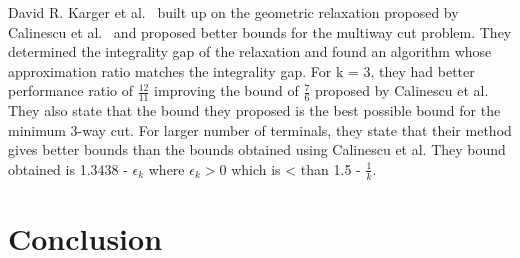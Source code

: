 \documentclass[11pt]{article}
\begin{document}
David R. Karger et al.~\cite{Karger_current} built up on the geometric relaxation proposed by Calinescu et al.~\cite{Dahlhaus} and proposed better bounds for the multiway cut problem. They determined the integrality gap of the relaxation and found an algorithm whose approximation ratio matches the integrality gap. For k = 3, they had better performance ratio of $\frac{12}{11}$ improving the bound of $\frac{7}{6}$ proposed by Calinescu et al. They also state that the bound they proposed is the best possible bound for the minimum 3-way cut. For larger number of terminals, they state that their method gives better bounds than the bounds obtained using Calinescu et al. They bound obtained is 1.3438 - $\epsilon_k$ where $\epsilon_k > 0$ which is < than 1.5 - $\frac{1}{k}$. 

\section{Conclusion}



{ %
  \small 
  
  
}
\end{document}

